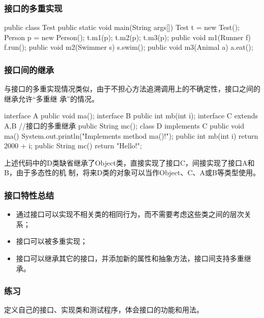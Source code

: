 \begin{frame}[fragile] %
\frametitle{接口的多重实现}
\begin{javaCode}
public class Test {
  public static void main(String args[]) {
    Test t = new Test();
    Person p = new Person();
    t.m1(p);
    t.m2(p);
    t.m3(p);
  }
  public void m1(Runner f) {
    f.run();
  }
  public void m2(Swimmer s) {
    s.swim();
  }
  public void m3(Animal a) {
    a.eat();
  }
}
\end{javaCode}
\end{frame}

\begin{frame}[fragile] %
\frametitle{接口间的继承}

与接口的多重实现情况类似，由于不担心方法追溯调用上的不确定性，接口之间的继承允许“多重继
承”的情况。
\begin{javaCode}
interface A {
  public void ma();
}
interface B {
  public int mb(int i);
}
interface C extends A,B {  //接口的多重继承
  public String mc();
}
class D implements C {
  public void ma() {
    System.out.println("Implements method ma()!");
  }
  public int mb(int i) {
    return 2000 + i;
  }
  public String mc() {
    return "Hello!";
  }
}
\end{javaCode}
{\footnotesize \Mage 上述代码中的D类缺省继承了Object类，直接实现了接口C，间接实现了接口A和B，由于多态性的机
制，将来D类的对象可以当作Object、C、A或B等类型使用。}
\end{frame}

\begin{frame}[fragile] %
\frametitle{接口特性总结}
\begin{itemize}
\item 通过接口可以实现不相关类的相同行为，而不需要考虑这些类之间的层次关系；
\item 接口可以被多重实现；
\item 接口可以继承其它的接口，并添加新的属性和抽象方法，接口间支持多重继承。
\end{itemize}
\end{frame}

\begin{frame}[fragile] %
\frametitle{练习}
定义自己的接口、实现类和测试程序，体会接口的功能和用法。
\end{frame}

